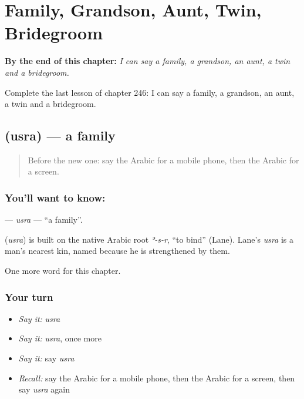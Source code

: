 
\chapter{Family, Grandson, Aunt, Twin, Bridegroom}
\label{ch:ar-family-grandson-aunt-twin-bridegroom}

\begin{chapteropening}
\textbf{By the end of this chapter:} \emph{I can say a family, a grandson, an aunt, a twin and a bridegroom.}

Complete the last lesson of chapter 246: I can say a family, a grandson, an aunt, a twin and a bridegroom.
\end{chapteropening}

\section[\texorpdfstring{\ar{أسرة} (usra)}{أسرة (usra)}]{ (usra) — a family}

\label{lesson:AR-C246-usra}



\begin{quote}
Before the new one: say the Arabic for a mobile phone, then the Arabic for a screen.
\end{quote}

\subsection*{You'll want to know: }
\textbf{} — \emph{usra} — \textquotedblleft{}a family\textquotedblright{}.

\begin{cousinweb}
\textbf{} (\emph{usra}) is built on the native Arabic root \emph{ʾ-s-r}, \textquotedblleft{}to bind\textquotedblright{} (Lane). Lane's \emph{usra} is a man's nearest kin, named because he is strengthened by them.
\end{cousinweb}

\begin{grammarlens}[title={What you've built}]
One more word for this chapter.
\end{grammarlens}

\subsection*{Your turn}
\begin{itemize}
\raggedright
  \item \emph{Say it:} \emph{usra}
  \item \emph{Say it:} \emph{usra}, once more
  \item \emph{Say it:} say \emph{usra}
  \item \emph{Recall:} say the Arabic for a mobile phone, then the Arabic for a screen, then say \emph{usra} again
\end{itemize}

